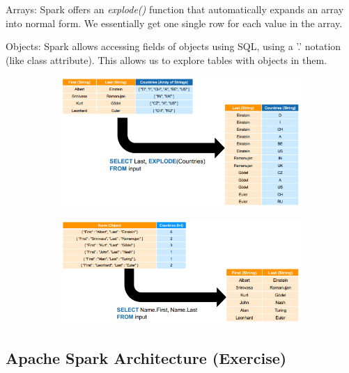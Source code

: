 \documentclass[11pt,oneside,a4paper]{article}
\begin{document}
\begin{compactitem}
\item Arrays: Spark offers an \textit{explode()} function that automatically expands an array into normal form. We essentially get one single row for each value in the array.
\item Objects: Spark allows accessing fields of objects using SQL, using a '.' notation (like class attribute). This allows us to explore tables with objects in them. 
\end{compactitem}

\begin{figure}[t!]
	\centering
	\begin{subfigure}[t]{.5\textwidth}
		\centering
		\includegraphics[width=0.9\linewidth]{figures/spark_nestedness_arrays}
	\end{subfigure}%
	\begin{subfigure}[t]{.5\textwidth}
		\centering
		\includegraphics[width=0.9\linewidth]{figures/spark_nestedness_objects}
	\end{subfigure}
\end{figure}

\newpage

\subsection{Apache Spark Architecture (Exercise)}
\end{document}
